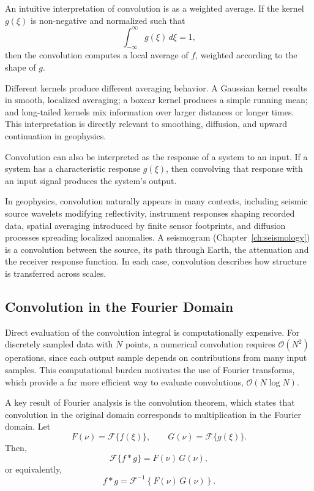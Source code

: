 An intuitive interpretation of convolution is as a weighted average. If the kernel $g(\xi)$ is non-negative and normalized such that
\[
    \int_{-\infty}^{\infty} g(\xi)\, d\xi = 1,
\]
then the convolution computes a local average of $f$, weighted according to the shape of $g$.

Different kernels produce different averaging behavior. A Gaussian kernel results in smooth, localized averaging; a boxcar kernel produces a simple running mean; and long-tailed kernels mix information over larger distances or longer times. This interpretation is directly relevant to smoothing, diffusion, and upward continuation in geophysics.

Convolution can also be interpreted as the response of a system to an input. If a system has a characteristic response $g(\xi)$, then convolving that response with an input signal produces the system's output. 

In geophysics, convolution naturally appears in many contexts, including seismic source wavelets modifying reflectivity, instrument responses shaping recorded data, spatial averaging introduced by finite sensor footprints, and diffusion processes spreading localized anomalies. A seismogram (Chapter~\ref{ch:seismology}) is a convolution between the source, its path through Earth, the attenuation and the receiver response function. In each case, convolution describes how structure is transferred across scales. 

\subsection{Convolution in the Fourier Domain}

Direct evaluation of the convolution integral is computationally expensive. For discretely sampled data with $N$ points, a numerical convolution requires $\mathcal{O}(N^2)$ operations, since each output sample depends on contributions from many input samples. This computational burden motivates the use of Fourier transforms, which provide a far more efficient way to evaluate convolutions, $\mathcal{O}(N \log N)$.

A key result of Fourier analysis is the convolution theorem, which states that convolution in the original domain corresponds to multiplication in the Fourier domain. Let
\[
    F(\nu) = \mathcal{F}\{f(\xi)\}, \qquad
    G(\nu) = \mathcal{F}\{g(\xi)\}.
\]
Then,
\[
    \mathcal{F}\{f * g\} = F(\nu)\,G(\nu),
\]
or equivalently,
\[
    f * g = \mathcal{F}^{-1}\!\left\{F(\nu)\,G(\nu)\right\}.
\]

